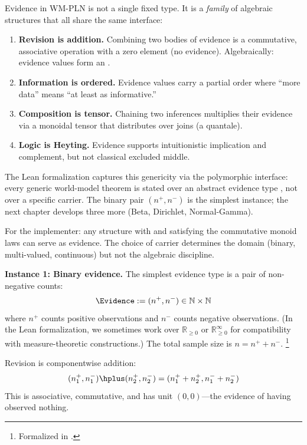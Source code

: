 \documentclass[11pt,openany]{report}
\begin{document}
Evidence in WM-PLN is not a single fixed type.  It is a \emph{family}
of algebraic structures that all share the same interface:

\begin{enumerate}
\item \textbf{Revision is addition.}  Combining two bodies of evidence
  is a commutative, associative operation with a zero element (no evidence).
  Algebraically: evidence values form an .

\item \textbf{Information is ordered.}  Evidence values carry a partial
  order where ``more data'' means ``at least as informative.''

\item \textbf{Composition is tensor.}  Chaining two inferences multiplies
  their evidence via a monoidal tensor that distributes over joins (a
  quantale).

\item \textbf{Logic is Heyting.}  Evidence supports intuitionistic
  implication and complement, but not classical excluded middle.
\end{enumerate}

\noindent
The Lean formalization captures this genericity via the polymorphic
 interface: every generic world-model theorem
is stated over an abstract evidence type , not over a specific
carrier.  The binary pair $(n^+, n^-)$ is the simplest instance; the
next chapter develops three more (Beta, Dirichlet, Normal-Gamma).

For the implementer: any structure with \code{+} and  satisfying
the commutative monoid laws can serve as evidence.  The choice of carrier
determines the domain (binary, multi-valued, continuous) but not the
algebraic discipline.

\medskip
\noindent
\textbf{Instance 1: Binary evidence.}
The simplest evidence type is a pair of non-negative counts:
\[
  \Evidence := (n^+, n^-) \in \mathbb{N} \times \mathbb{N}
\]
where $n^+$ counts positive observations and $n^-$ counts negative
observations.  (In the Lean formalization, we sometimes work over
$\mathbb{R}_{\ge 0}$ or $\mathbb{R}_{\ge 0}^\infty$ for compatibility
with measure-theoretic constructions.)  The total sample size is
$n = n^+ + n^-$.%
\footnote{Formalized in .}

Revision is componentwise addition:
\[
  (n_1^+, n_1^-) \hplus (n_2^+, n_2^-) = (n_1^+ + n_2^+, n_1^- + n_2^-)
\]
This is associative, commutative, and has unit $(0, 0)$---the evidence
of having observed nothing.
\end{document}
